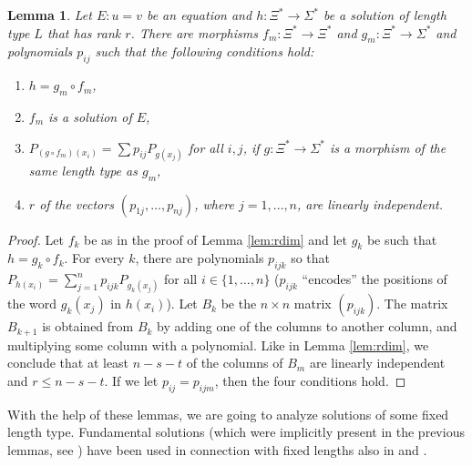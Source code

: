 \documentclass[submission]{eptcs}
\newtheorem{lemma}[theorem]{Lemma}
\theoremstyle{definition}
\newcommand{\px}[1]{ P_{#1} }
\begin{document}
\begin{lemma} \label{lem:rdim2}
Let $E: u = v$ be an equation and $h: \Xi^* \to \Sigma^*$ be a
solution of length type $L$ that has rank $r$. There are morphisms
$f_m: \Xi^* \to \Xi^*$ and $g_m: \Xi^* \to \Sigma^*$ and polynomials
$p_{ij}$ such that the following conditions hold:
\begin{enumerate}
\item $h = g_m \circ f_m$,
\item $f_m$ is a solution of $E$,
\item $\px{(g \circ f_m)(x_i)} = \sum p_{ij} \px{g(x_j)}$ for all
    $i,j$, if $g: \Xi^* \to \Sigma^*$ is a morphism of the same
    length type as $g_m$,
\item $r$ of the vectors $(p_{1j}, \dots, p_{nj})$, where
    $j = 1, \dots, n$, are linearly independent.
\end{enumerate}
\end{lemma}
\begin{proof}
Let $f_k$ be as in the proof of Lemma \ref{lem:rdim} and let $g_k$
be such that $h = g_k \circ f_k$. For every $k$, there are
polynomials $p_{ijk}$ so that
\begin{math}
    \px{h(x_i)} = \sum_{j=1}^n p_{ijk} \px{g_k(x_j)}
\end{math}
for all $i \in \{1, \dots, n\}$ ($p_{ijk}$ ``encodes'' the positions
of the word $g_k(x_j)$ in $h(x_i)$). Let $B_k$ be the $n \times n$
matrix
\begin{math}
    (p_{ijk}).
\end{math}
The matrix $B_{k+1}$ is obtained from $B_k$ by adding one of the
columns to another column, and multiplying some column with a
polynomial. Like in Lemma \ref{lem:rdim}, we conclude that at least
$n-s-t$ of the columns of $B_m$ are linearly independent and $r \leq
n-s-t$. If we let $p_{ij} = p_{ijm}$, then the four conditions hold.
\end{proof}

With the help of these lemmas, we are going to analyze solutions of
some fixed length type. Fundamental solutions (which were implicitly
present in the previous lemmas, see \cite{Lo83}) have been used in
connection with fixed lengths also in \cite{Ho01} and \cite{Ho00}.
\end{document}

